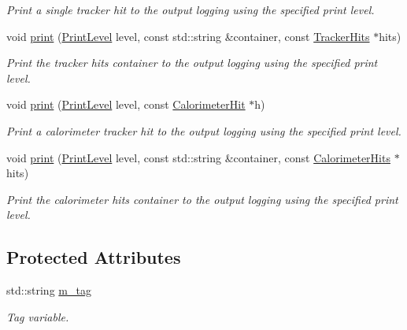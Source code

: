 \begin{DoxyCompactItemize}
\begin{DoxyCompactList}\small\item\em Print a single tracker hit to the output logging using the specified print level. \end{DoxyCompactList}\item 
void \hyperlink{class_d_d4hep_1_1_simulation_1_1_geant4_data_dump_a2427e186357f34940bb19be59406e7c9}{print} (\hyperlink{namespace_d_d4hep_a5b5a64d56252469451f2020a27d57d42}{Print\+Level} level, const std\+::string \&container, const \hyperlink{class_d_d4hep_1_1_simulation_1_1_geant4_data_dump_aa71f3341672792aa15c10e82cdbeca4b}{Tracker\+Hits} $\ast$hits)
\begin{DoxyCompactList}\small\item\em Print the tracker hits container to the output logging using the specified print level. \end{DoxyCompactList}\item 
void \hyperlink{class_d_d4hep_1_1_simulation_1_1_geant4_data_dump_a213bbcf2c9fb78f71afefe34935f3017}{print} (\hyperlink{namespace_d_d4hep_a5b5a64d56252469451f2020a27d57d42}{Print\+Level} level, const \hyperlink{class_d_d4hep_1_1_simulation_1_1_geant4_data_dump_abbb746f00c083cdb09c3e0331cb920be}{Calorimeter\+Hit} $\ast$h)
\begin{DoxyCompactList}\small\item\em Print a calorimeter tracker hit to the output logging using the specified print level. \end{DoxyCompactList}\item 
void \hyperlink{class_d_d4hep_1_1_simulation_1_1_geant4_data_dump_aedbce540469e2c554096f3b87fbd9991}{print} (\hyperlink{namespace_d_d4hep_a5b5a64d56252469451f2020a27d57d42}{Print\+Level} level, const std\+::string \&container, const \hyperlink{class_d_d4hep_1_1_simulation_1_1_geant4_data_dump_a405c85a9a72c4f1dc0164d4a61d98f75}{Calorimeter\+Hits} $\ast$hits)
\begin{DoxyCompactList}\small\item\em Print the calorimeter hits container to the output logging using the specified print level. \end{DoxyCompactList}\end{DoxyCompactItemize}
\subsection*{Protected Attributes}
\begin{DoxyCompactItemize}
\item 
std\+::string \hyperlink{class_d_d4hep_1_1_simulation_1_1_geant4_data_dump_a58986bd9d08cd72f5d5b780d0047e5e6}{m\+\_\+tag}
\begin{DoxyCompactList}\small\item\em Tag variable. \end{DoxyCompactList}\end{DoxyCompactItemize}


